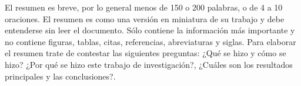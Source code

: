 El resumen es breve, por lo general menos de 150 o 200 palabras, o de 4 a 10 oraciones. El resumen es como una versión en miniatura de su trabajo y debe entenderse sin leer el documento. Sólo contiene la información más importante y no contiene figuras, tablas, citas,  referencias, abreviaturas y siglas. Para elaborar el resumen trate de contestar las siguientes preguntas: ¿Qué se hizo y cómo se hizo? ¿Por qué  se hizo este trabajo de investigación?,  ¿Cuáles son los resultados principales y las conclusiones?.

